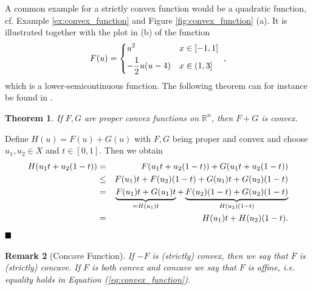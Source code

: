 \documentclass[abstracton]{scrreprt}
\newcommand{\qed}{$\hfill\blacksquare$}
\newtheorem{theorem}{Theorem}[chapter]
\newtheorem{remark}[theorem]{Remark}
\newenvironment{proof}[1][Proof]{\begin{trivlist}
\item[\hskip \labelsep {\bfseries #1}]}{\end{trivlist}}
\begin{document}
        A common example for a strictly convex function would be a quadratic function, cf. Example \ref{ex:convex_function} and Figure \ref{fig:convex_function} (a). It is illustrated together with the plot in (b) of the function
            \begin{equation}
                F(u) =
                    \begin{dcases*}
                        u^{2} & \textnormal{$x \in [-1, 1]$} \\
                        - \frac{1}{2} u(u - 4) & \textnormal{$x \in (1, 3]$}
                    \end{dcases*},
                \label{eq:lsc_example}
            \end{equation}
        which is a lower-semicontinuous function. The following theorem can for instance be found in \cite{Rockafellar}.
        \begin{theorem} %
            If $F, G$ are proper convex functions on $\mathbb{R}^{n}$, then $F + G$ is convex.
        \end{theorem}
        \begin{proof} %
            Define $H(u) = F(u) + G(u)$ with $F, G$ being proper and convex and choose $u_{1}, u_{2} \in X$ and $t \in [0, 1]$. Then we obtain
            \begin{eqnarray}
                H(u_{1}t + u_{2}(1 - t)) &=& F(u_{1}t + u_{2}(1 - t)) + G(u_{1}t + u_{2}(1 - t)) \notag \\ 
                &\le& F(u_{1})t + F(u_{2})(1 - t) + G(u_{1})t + G(u_{2})(1 - t) \notag \\
                &=& \underbrace{F(u_{1})t + G(u_{1})t}_{= H(u_{1})t} + \underbrace{F(u_{2})(1 - t) + G(u_{2})(1 - t)}_{H(u_{2})(1 - t)} \notag \\
                &=& H(u_{1})t + H(u_{2})(1 - t). \notag
            \end{eqnarray}\qed
        \end{proof}
        \begin{remark}[Concave Function] %
            \label{rem:concave_function}
            If $-F$ is (strictly) convex, then we say that $F$ is (strictly) concave. If $F$ is both convex and concave we say that $F$ is affine, i.e. equality holds in Equation (\ref{eq:convex_function}).
        \end{remark}
\end{document}
